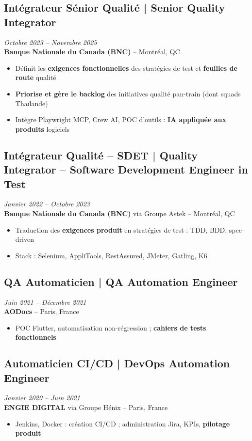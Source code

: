 \documentclass[11pt,a4paper]{article}
\begin{document}
\subsection*{Intégrateur Sénior Qualité | Senior Quality Integrator} \hfill \textit{Octobre 2023 -- Novembre 2025}\\
\textbf{Banque Nationale du Canada (BNC)} -- Montréal, QC\\
\begin{itemize}
    \item Définit les \textbf{exigences fonctionnelles} des stratégies de test et \textbf{feuilles de route} qualité
    \item \textbf{Priorise et gère le backlog} des initiatives qualité pan-train (dont squads Thaïlande)
    \item Intègre Playwright MCP, Crew AI, POC d'outils : \textbf{IA appliquée aux produits} logiciels
\end{itemize}

\subsection*{Intégrateur Qualité -- SDET | Quality Integrator -- Software Development Engineer in Test} \hfill \textit{Janvier 2022 -- Octobre 2023}\\
\textbf{Banque Nationale du Canada (BNC)} via Groupe Astek -- Montréal, QC\\
\begin{itemize}
    \item Traduction des \textbf{exigences produit} en stratégies de test : TDD, BDD, spec-driven
    \item Stack : Selenium, AppliTools, RestAssured, JMeter, Gatling, K6
\end{itemize}

\subsection*{QA Automaticien | QA Automation Engineer} \hfill \textit{Juin 2021 -- Décembre 2021}\\
\textbf{AODocs} -- Paris, France\\
\begin{itemize}
    \item POC Flutter, automatisation non-régression ; \textbf{cahiers de tests fonctionnels}
\end{itemize}

\subsection*{Automaticien CI/CD | DevOps Automation Engineer} \hfill \textit{Janvier 2020 -- Juin 2021}\\
\textbf{ENGIE DIGITAL} via Groupe Hénix -- Paris, France\\
\begin{itemize}
    \item Jenkins, Docker : création CI/CD ; administration Jira, KPIs, \textbf{pilotage produit}
\end{itemize}
\end{document}

